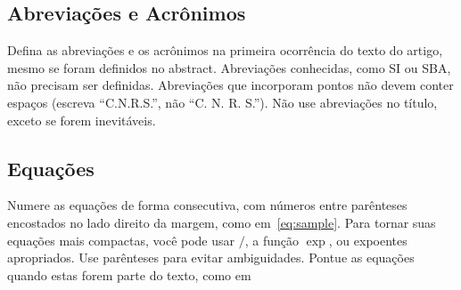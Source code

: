
\subsection{Abreviações e Acrônimos}

Defina as abreviações e os acrônimos na primeira ocorrência do texto do artigo, 
mesmo se foram definidos no abstract. Abreviações conhecidas, como SI ou SBA, não
precisam ser definidas. Abreviações que incorporam pontos não devem conter espaços
(escreva ``C.N.R.S.'', não ``C. N. R. S.''). Não use abreviações no título, exceto
se forem inevitáveis. 

\subsection{Equações}

Numere as equações de forma consecutiva, com números entre parênteses
encostados no lado direito da
margem, como em~\eqref{eq:sample}. Para tornar suas equações mais compactas,
você pode usar $/$, a função $\exp$, ou expoentes apropriados. Use parênteses para
evitar ambiguidades. Pontue as equações quando estas forem parte do texto, como em

